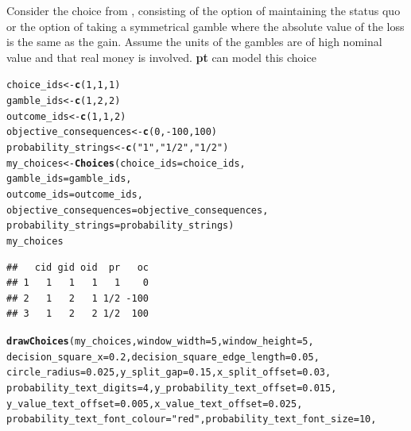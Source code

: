 \documentclass{article}\usepackage[]{graphicx}\usepackage[]{color}
\makeatletter
\newcommand{\hlnum}[1]{\textcolor[rgb]{0.686,0.059,0.569}{#1}}%
\newcommand{\hlstr}[1]{\textcolor[rgb]{0.192,0.494,0.8}{#1}}%
\newcommand{\hlopt}[1]{\textcolor[rgb]{0,0,0}{#1}}%
\newcommand{\hlstd}[1]{\textcolor[rgb]{0.345,0.345,0.345}{#1}}%
\newcommand{\hlkwb}[1]{\textcolor[rgb]{0.69,0.353,0.396}{#1}}%
\newcommand{\hlkwc}[1]{\textcolor[rgb]{0.333,0.667,0.333}{#1}}%
\newcommand{\hlkwd}[1]{\textcolor[rgb]{0.737,0.353,0.396}{\textbf{#1}}}%
\newenvironment{kframe}{%
 \def\at@end@of@kframe{}%
 \ifinner\ifhmode%
  \def\at@end@of@kframe{\end{minipage}}%
  \begin{minipage}{\columnwidth}%
 \fi\fi%
 \def\FrameCommand##1{\hskip\@totalleftmargin \hskip-\fboxsep
 \colorbox{shadecolor}{##1}\hskip-\fboxsep
     \hskip-\linewidth \hskip-\@totalleftmargin \hskip\columnwidth}%
 \MakeFramed {\advance\hsize-\width
   \@totalleftmargin\z@ \linewidth\hsize
   \@setminipage}}%
 {\par\unskip\endMakeFramed%
 \at@end@of@kframe}
\newenvironment{knitrout}{}{} %
\makeatother
\begin{document}
Consider the choice from \citet[][Table 5 p. 221]{Erev_2013}, consisting of the option of maintaining the status quo or the option of taking a symmetrical gamble where the absolute value of the loss is the same as the gain. Assume the units of the gambles are of high nominal value and that real money is involved. {\bf pt} can model this choice

\begin{knitrout}
\color{fgcolor}\begin{kframe}
\begin{alltt}
\hlstd{choice_ids} \hlkwb{<-} \hlkwd{c}\hlstd{(}\hlnum{1}\hlstd{,} \hlnum{1}\hlstd{,} \hlnum{1}\hlstd{)}
\hlstd{gamble_ids} \hlkwb{<-} \hlkwd{c}\hlstd{(}\hlnum{1}\hlstd{,} \hlnum{2}\hlstd{,} \hlnum{2}\hlstd{)}
\hlstd{outcome_ids} \hlkwb{<-} \hlkwd{c}\hlstd{(}\hlnum{1}\hlstd{,} \hlnum{1}\hlstd{,} \hlnum{2}\hlstd{)}
\hlstd{objective_consequences} \hlkwb{<-} \hlkwd{c}\hlstd{(}\hlnum{0}\hlstd{,} \hlopt{-}\hlnum{100}\hlstd{,} \hlnum{100}\hlstd{)}
\hlstd{probability_strings} \hlkwb{<-} \hlkwd{c}\hlstd{(}\hlstr{"1"}\hlstd{,} \hlstr{"1/2"}\hlstd{,} \hlstr{"1/2"}\hlstd{)}
\hlstd{my_choices} \hlkwb{<-} \hlkwd{Choices}\hlstd{(}\hlkwc{choice_ids}\hlstd{=choice_ids,}
        \hlkwc{gamble_ids}\hlstd{=gamble_ids,}
        \hlkwc{outcome_ids}\hlstd{=outcome_ids,}
        \hlkwc{objective_consequences}\hlstd{=objective_consequences,}
        \hlkwc{probability_strings}\hlstd{=probability_strings)}
\hlstd{my_choices}
\end{alltt}
\begin{verbatim}
##   cid gid oid  pr   oc
## 1   1   1   1   1    0
## 2   1   2   1 1/2 -100
## 3   1   2   2 1/2  100
\end{verbatim}
\begin{alltt}
\hlkwd{drawChoices}\hlstd{(my_choices,} \hlkwc{window_width}\hlstd{=}\hlnum{5}\hlstd{,} \hlkwc{window_height}\hlstd{=}\hlnum{5}\hlstd{,}
        \hlkwc{decision_square_x}\hlstd{=}\hlnum{0.2}\hlstd{,} \hlkwc{decision_square_edge_length}\hlstd{=}\hlnum{0.05}\hlstd{,}
        \hlkwc{circle_radius}\hlstd{=}\hlnum{0.025}\hlstd{,} \hlkwc{y_split_gap}\hlstd{=}\hlnum{0.15}\hlstd{,} \hlkwc{x_split_offset}\hlstd{=}\hlnum{0.03}\hlstd{,}
        \hlkwc{probability_text_digits}\hlstd{=}\hlnum{4}\hlstd{,} \hlkwc{y_probability_text_offset}\hlstd{=}\hlnum{0.015}\hlstd{,}
        \hlkwc{y_value_text_offset}\hlstd{=}\hlnum{0.005}\hlstd{,} \hlkwc{x_value_text_offset}\hlstd{=}\hlnum{0.025}\hlstd{,}
        \hlkwc{probability_text_font_colour}\hlstd{=}\hlstr{"red"}\hlstd{,} \hlkwc{probability_text_font_size}\hlstd{=}\hlnum{10}\hlstd{,}

\end{alltt}
\end{kframe}
\end{knitrout}
\end{document}
